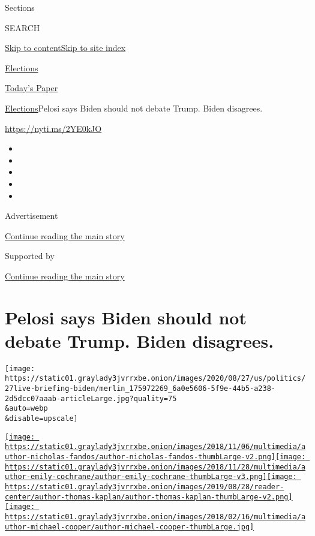 Sections

SEARCH

\protect\hyperlink{site-content}{Skip to
content}\protect\hyperlink{site-index}{Skip to site index}

\href{https://www.nytimes3xbfgragh.onion/news-event/2020-election}{Elections}

\href{https://myaccount.nytimes3xbfgragh.onion/auth/login?response_type=cookie\&client_id=vi}{}

\href{https://www.nytimes3xbfgragh.onion/section/todayspaper}{Today's
Paper}

\href{/news-event/2020-election}{Elections}\textbar{}Pelosi says Biden
should not debate Trump. Biden disagrees.

\url{https://nyti.ms/2YE0kJO}

\begin{itemize}
\item
\item
\item
\item
\item
\end{itemize}

Advertisement

\protect\hyperlink{after-top}{Continue reading the main story}

Supported by

\protect\hyperlink{after-sponsor}{Continue reading the main story}

\hypertarget{pelosi-says-biden-should-not-debate-trump-biden-disagrees}{%
\section{Pelosi says Biden should not debate Trump. Biden
disagrees.}\label{pelosi-says-biden-should-not-debate-trump-biden-disagrees}}

\texttt{[image: https://static01.graylady3jvrrxbe.onion/images/2020/08/27/us/politics/27live-briefing-biden/merlin\_175972269\_6a0e5606-5f9e-44b5-a238-2d5dcc07aaab-articleLarge.jpg?quality=75\\\&auto=webp\\\&disable=upscale]}

\href{https://www.nytimes3xbfgragh.onion/by/nicholas-fandos}{\texttt{[image: https://static01.graylady3jvrrxbe.onion/images/2018/11/06/multimedia/author-nicholas-fandos/author-nicholas-fandos-thumbLarge-v2.png]}}\href{https://www.nytimes3xbfgragh.onion/by/emily-cochrane}{\texttt{[image: https://static01.graylady3jvrrxbe.onion/images/2018/11/28/multimedia/author-emily-cochrane/author-emily-cochrane-thumbLarge-v3.png]}}\href{https://www.nytimes3xbfgragh.onion/by/thomas-kaplan}{\texttt{[image: https://static01.graylady3jvrrxbe.onion/images/2019/08/28/reader-center/author-thomas-kaplan/author-thomas-kaplan-thumbLarge-v2.png]}}\href{https://www.nytimes3xbfgragh.onion/by/michael-cooper}{\texttt{[image: https://static01.graylady3jvrrxbe.onion/images/2018/02/16/multimedia/author-michael-cooper/author-michael-cooper-thumbLarge.jpg]}}

